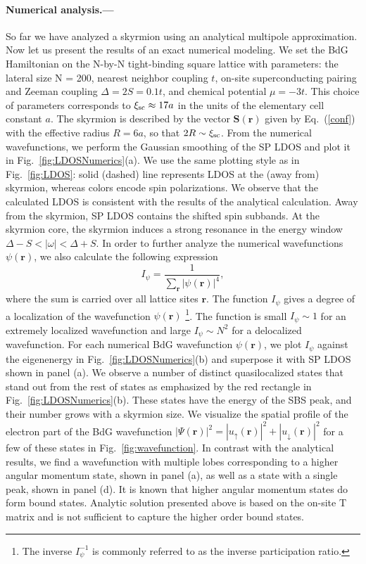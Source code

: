 \documentclass[twocolumn,showpacs,floatfix,longbibliography]{revtex4-1}
\begin{document}
\paragraph*{Numerical analysis.---} \label{sec:numerics}
So far we have analyzed a skyrmion using an analytical multipole approximation. Now let us present the results of an exact numerical modeling. We set the BdG Hamiltonian on the N-by-N tight-binding square lattice with parameters: the lateral size N = 200, nearest neighbor coupling $t$, on-site superconducting pairing and Zeeman coupling $\Delta=2S=0.1t$, and chemical potential $\mu = -3t$. This choice of parameters corresponds to $\xi_{\rm sc}\approx 17 a$ in the units of the elementary cell constant $a$. The skyrmion is described by the vector $\bm S(\bm r)$ given by Eq.~(\ref{conf}) with the effective radius $R = 6a$, so that $2R\sim \xi_{\rm sc}$. From the numerical wavefunctions, we perform the Gaussian smoothing of the SP LDOS and plot it in Fig.~\ref{fig:LDOSNumerics}(a). We use the same plotting style as in Fig.~\ref{fig:LDOS}: solid (dashed) line represents LDOS at the (away from) skyrmion, whereas colors encode spin polarizations. We observe that the calculated LDOS is consistent with the results of the analytical calculation. Away from the skyrmion, SP LDOS contains the shifted spin subbands. At the skyrmion core, the skyrmion induces a strong resonance in the energy window $\Delta-S<|\omega|<\Delta+S$. In order to further analyze the numerical wavefunctions $\psi(\bm r)$, we also calculate the following expression
\begin{equation}
	I_\psi =\frac{1}{\sum_{\bm r} |\psi(\bm r)|^4},
	\label{I}
\end{equation}
where the sum is carried over all lattice sites $\bm r$. The function $I_\psi$ gives a degree of a localization of the wavefunction $\psi(\bm r)$ \footnote{The inverse $I_\psi^{-1}$ is commonly referred to as the inverse participation ratio.}. The function is small $I_\psi \sim 1$ for an extremely localized wavefunction and large $I_\psi \sim N^2$ for a delocalized wavefunction. For each numerical BdG wavefunction $\psi(\bm r)$, we plot $I_\psi$ against the eigenenergy in Fig.~\ref{fig:LDOSNumerics}(b) and superpose it with SP LDOS shown in panel (a). We observe a number of distinct quasilocalized states that stand out from the rest of states as emphasized by the red rectangle in Fig.~\ref{fig:LDOSNumerics}(b). These states have the energy of the SBS peak, and their number grows with a skyrmion size. We visualize the spatial profile of the electron part of the BdG wavefunction $|\Psi(\bm r)|^2 = |u_{\uparrow}(\bm r)|^2+|u_{\downarrow}(\bm r)|^2$  for a few of these states in Fig.~\ref{fig:wavefunction}. In contrast with the analytical results, we find a wavefunction with multiple lobes corresponding to a higher angular momentum state, shown in panel (a), as well as a state with a single peak, shown in panel (d). It is known that higher angular momentum states do form bound states. Analytic solution presented above is based on the on-site T matrix and is not sufficient to capture the higher order bound states.
\end{document}
